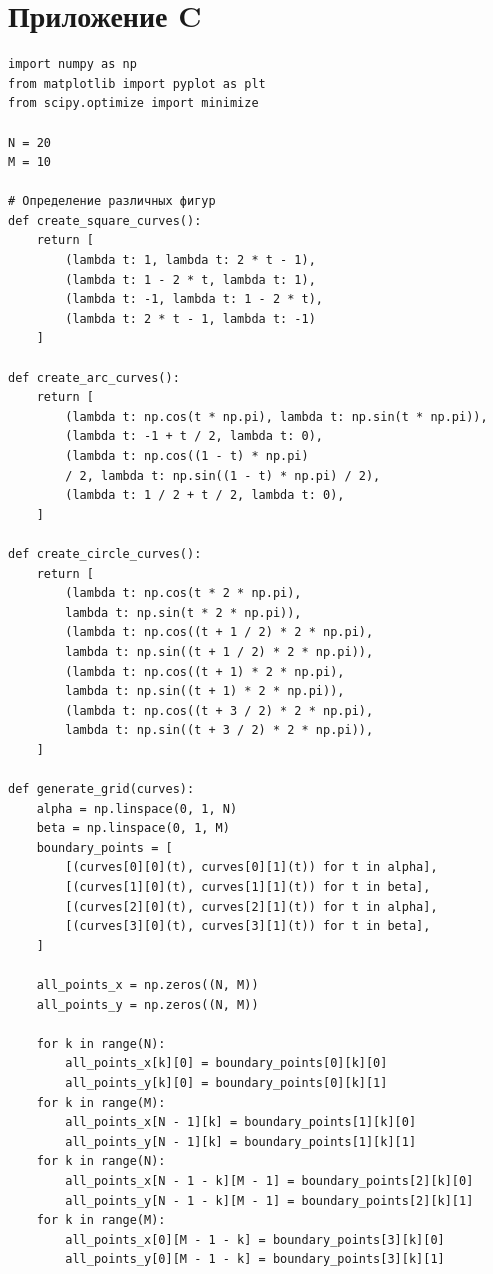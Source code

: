 \documentclass[a4paper,14pt,russian]{extreport}
\renewcommand{\_}{\kern-1.5pt\textunderscore\kern-1.5pt}
\begin{document}
\section{Приложение C}
\begin{verbatim}
import numpy as np
from matplotlib import pyplot as plt
from scipy.optimize import minimize

N = 20
M = 10

# Определение различных фигур
def create_square_curves():
    return [
        (lambda t: 1, lambda t: 2 * t - 1),
        (lambda t: 1 - 2 * t, lambda t: 1),
        (lambda t: -1, lambda t: 1 - 2 * t),
        (lambda t: 2 * t - 1, lambda t: -1)
    ]

def create_arc_curves():
    return [
        (lambda t: np.cos(t * np.pi), lambda t: np.sin(t * np.pi)),
        (lambda t: -1 + t / 2, lambda t: 0),
        (lambda t: np.cos((1 - t) * np.pi)
        / 2, lambda t: np.sin((1 - t) * np.pi) / 2),
        (lambda t: 1 / 2 + t / 2, lambda t: 0),
    ]

def create_circle_curves():
    return [
        (lambda t: np.cos(t * 2 * np.pi), 
        lambda t: np.sin(t * 2 * np.pi)),
        (lambda t: np.cos((t + 1 / 2) * 2 * np.pi),
        lambda t: np.sin((t + 1 / 2) * 2 * np.pi)),
        (lambda t: np.cos((t + 1) * 2 * np.pi), 
        lambda t: np.sin((t + 1) * 2 * np.pi)),
        (lambda t: np.cos((t + 3 / 2) * 2 * np.pi), 
        lambda t: np.sin((t + 3 / 2) * 2 * np.pi)),
    ]

def generate_grid(curves):
    alpha = np.linspace(0, 1, N)
    beta = np.linspace(0, 1, M)
    boundary_points = [
        [(curves[0][0](t), curves[0][1](t)) for t in alpha],
        [(curves[1][0](t), curves[1][1](t)) for t in beta],
        [(curves[2][0](t), curves[2][1](t)) for t in alpha],
        [(curves[3][0](t), curves[3][1](t)) for t in beta],
    ]

    all_points_x = np.zeros((N, M))
    all_points_y = np.zeros((N, M))

    for k in range(N):
        all_points_x[k][0] = boundary_points[0][k][0]
        all_points_y[k][0] = boundary_points[0][k][1]
    for k in range(M):
        all_points_x[N - 1][k] = boundary_points[1][k][0]
        all_points_y[N - 1][k] = boundary_points[1][k][1]
    for k in range(N):
        all_points_x[N - 1 - k][M - 1] = boundary_points[2][k][0]
        all_points_y[N - 1 - k][M - 1] = boundary_points[2][k][1]
    for k in range(M):
        all_points_x[0][M - 1 - k] = boundary_points[3][k][0]
        all_points_y[0][M - 1 - k] = boundary_points[3][k][1]


\end{verbatim}
\end{document}
